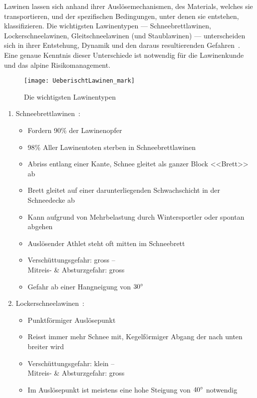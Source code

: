 Lawinen lassen sich anhand ihrer Auslösemechanismen, des Materials, welches sie transportieren, und der spezifischen Bedingungen, unter denen sie entstehen, klassifizieren. Die wichtigsten Lawinentypen --- Schneebrettlawinen, Lockerschneelawinen, Gleitschneelawinen (und Staublawinen) --- unterscheiden sich in ihrer Entstehung, Dynamik und den daraus resultierenden Gefahren~\cite{harveyrhynerschweizerlawinenkunde}. Eine genaue Kenntnis dieser Unterschiede ist notwendig für die Lawinenkunde und das alpine Risikomanagement.
\begin{figure}[H]
  \centering
  \texttt{[image: UeberischtLawinen\_mark]}
  \caption{Die wichtigsten Lawinentypen~\cite{ortovoxlabsnow}}\label{fig:lawinentypen}
\end{figure}
\pagebreak
\begin{enumerate}
  \item Schneebrettlawinen~\cite{harveyrhynerschweizerlawinenkunde}\cite{sacbergspwinter}\cite{slfLawinentypen}\cite{ortovoxlabsnow}:
  \begin{itemize}
    \item Fordern 90\% der Lawinenopfer
    \item 98\% Aller Lawinentoten sterben in Schneebrettlawinen
    \item Abriss entlang einer Kante, Schnee gleitet als ganzer Block <<Brett>> ab
    \item Brett gleitet auf einer darunterliegenden Schwachschicht in der Schneedecke ab
    \item Kann aufgrund von Mehrbelastung durch Wintersportler oder spontan abgehen
    \item Auslösender Athlet steht oft mitten im Schneebrett
    \item Verschüttungsgefahr: gross –\\ Mitreis- \& Absturzgefahr: gross
    \item Gefahr ab einer Hangneigung von $30\degree$
  \end{itemize}
    
  \item Lockerschneelawinen~\cite{harveyrhynerschweizerlawinenkunde}\cite{sacbergspwinter}\cite{slfLawinentypen}:
  \begin{itemize}
    \item Punktförmiger Auslösepunkt
    \item Reisst immer mehr Schnee mit, Kegelförmiger Abgang der nach unten breiter wird
    \item Verschüttungsgefahr: klein –\\ Mitreis- \& Absturzgefahr: gross
    \item Im Auslösepunkt ist meistens eine hohe Steigung von $40\degree$ notwendig
  \end{itemize}


\end{enumerate}
